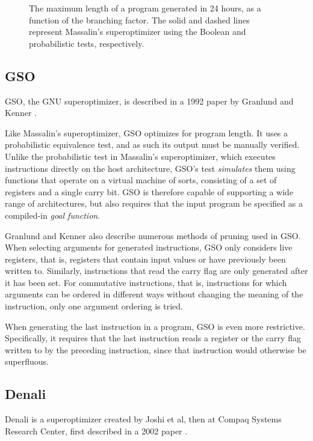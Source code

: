 \documentclass[a4paper,11pt]{kth-mag}
\begin{document}

\begin{figure}
\centering

\caption{The maximum length of a program generated in 24 hours, as a function of the branching factor.
The solid and dashed lines represent Massalin's superoptimizer using the Boolean and probabilistic tests, respectively.}
\label{fig:so_program_length}
\end{figure}

\subsection{GSO}

GSO, the GNU superoptimizer, is described in a 1992 paper by Granlund and Kenner \cite{granlund92}.

Like Massalin's superoptimizer, GSO optimizes for program length.
It uses a probabilistic equivalence test, and as such its output must be manually verified.
Unlike the probabilistic test in Massalin's superoptimizer, which executes instructions directly on the host architecture, GSO's test \emph{simulates} them using functions that operate on a virtual machine of sorts, consisting of a set of registers and a single carry bit.
GSO is therefore capable of supporting a wide range of architectures, but also requires that the input program be specified as a compiled-in \emph{goal function}.

Granlund and Kenner also describe numerous methods of pruning used in GSO.
When selecting arguments for generated instructions, GSO only considers live registers, that is, registers that contain input values or have previously been written to.
Similarly, instructions that read the carry flag are only generated after it has been set.
For commutative instructions, that is, instructions for which arguments can be ordered in different ways without changing the meaning of the instruction, only one argument ordering is tried.

When generating the last instruction in a program, GSO is even more restrictive.
Specifically, it requires that the last instruction reads a register or the carry flag written to by the preceding instruction, since that instruction would otherwise be superfluous.

\subsection{Denali}

Denali is a superoptimizer created by Joshi et al, then at Compaq Systems Research Center, first described in a 2002 paper \cite{joshi02}.
\end{document}
